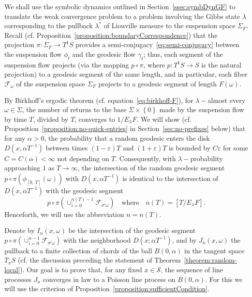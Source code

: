 \documentclass[10pt]{amsart}
\theoremstyle{definition}\newtheorem{defi}[theo]{Definition}\newtheorem{rema}[theo]{Remark}\newtheorem{exam}[theo]{Example}\newtheorem{exem}[theo]{Example}\newtheorem{nota}[theo]{Notation}
\newcommand{\xset}[1]{\left\{ #1 \right\}}
\begin{document}
We shall use the symbolic dynamics outlined in Section~\ref{ssec:symbDynGF} to translate the weak convergence problem to a problem involving the Gibbs state $\lambda$ corresponding to the pullback $\lambda^{*}$ of Liouville measure to the suspension space $\Sigma_{F}$. Recall (cf. Proposition~\ref{proposition:boundaryCorrespondence}) that the projection $\pi:\Sigma_{F}\rightarrow T^{1}S$ provides a semi-conjugacy~\eqref{eq:semi-conjugacy} between the suspension flow $\phi_{t}$ and the geodesic flow $\gamma_{t}$; thus, each segment of the suspension flow projects (via the mapping $p\circ\pi$, where $p:T^{1}S\rightarrow S$ is the natural projection) to a geodesic segment of the same length, and in particular, each fiber $\mathcal{F}_{\omega}$ of the suspension space $\Sigma_{F}$ projects to a geodesic segment of length $F(\omega)$.


By Birkhoff's ergodic theorem (cf. equation~\eqref{eq:birkhoff-F}), for $\lambda-$almost every $\omega \in
\Sigma$, the number of returns to the base $\Sigma \times \xset {0}$ made by the suspension flow by time $T$, divided by $T$, converges to $1/E_{\lambda}F $. We will show (cf. Proposition~\ref{proposition:no-quick-entries} in Section~\ref{sec:no-prefixes} below) that for any $\alpha>0$, the probability that a random geodesic enters the disk $D(x,\alpha T^{-1})$ between times $(1- \varepsilon)T$ and $(1+ \varepsilon)T$ is bounded by $C\varepsilon$ for some $C=C(\alpha)<\infty$ not depending on $T$. Consequently, with $\lambda-$probability approaching $1$ as $T\rightarrow\infty$, the intersection of the random geodesic segment $p \circ \pi (\phi_{[0,\,T]}(\omega))$ with $D(x, \alpha T^{-1})$ is identical to the intersection of $D(x, \alpha T^{-1})$ with the geodesic segment
\begin{equation}\label{eq:n}
p\circ\pi(\cup _{i=0}^{n(T)-1}\mathcal{F}_{\sigma^{i}\omega}) \quad\text{where} \quad n (T)= [T/E_{\lambda}F].
\end{equation}
Henceforth, we will use the abbreviation $n=n(T)$.

Denote by $I_{n} (x,\omega)$ be the intersection of the geodesic segment $p\circ\pi(\cup _{i=0}^{n-1}\mathcal{F}_{\sigma^{i}\omega})$ with the neighborhood $D(x;\alpha T^{-1})$, and by $J_{n}(x, \omega)$ the pullback to a finite collection of chords of the ball $B(0, \alpha)$ in the tangent space $T_{x}S$ (cf. the discussion preceding the statement of Theorem~\ref{theorem:random-local}). Our goal is to prove that, for any fixed $x\in \mathcal{S}$, the sequence of line processes $J_{n}$ converges in law to a Poisson line process on $B (0,\alpha)$. For this we will use the criterion of Proposition~\ref{proposition:sufficientCondition}.
\end{document}
